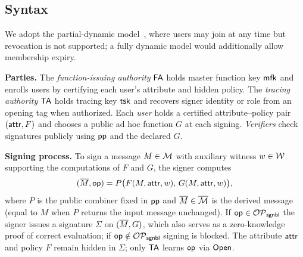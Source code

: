 \subsection{Syntax}\label{subsection:sms-syntax}

We adopt the partial-dynamic model~\cite{KiayiasY06},
where users may join at any time but revocation is not supported;
a fully dynamic model would additionally allow membership expiry.

\medskip
\noindent\textbf{Parties.}
The \emph{function-issuing authority} $\mathsf{FA}$ holds master function key $\mathsf{mfk}$
and enrolls users by certifying each user's attribute and hidden policy.
The \emph{tracing authority} $\mathsf{TA}$ holds tracing key $\mathsf{tsk}$
and recovers signer identity or role from an opening tag when authorized.
Each \emph{user} holds a certified attribute--policy pair $(\mathsf{attr}, F)$
and chooses a public ad hoc function $G$ at each signing.
\emph{Verifiers} check signatures publicly using $\mathsf{pp}$ and the declared $G$.

\medskip
\noindent\textbf{Signing process.}
To sign a message $M \in \mathcal{M}$ with auxiliary witness
$w \in \mathcal{W}$ supporting the computations of $F$ and $G$,
the signer computes
\[
(\overline{M}, \mathsf{op}) = P\bigl(F(M, \mathsf{attr}, w),\, G(M, \mathsf{attr}, w)\bigr),
\]
where $P$ is the public combiner fixed in $\mathsf{pp}$
and $\overline{M} \in \overline{\mathcal{M}}$ is the derived message
(equal to $M$ when $P$ returns the input message unchanged).
If $\mathsf{op} \in \mathcal{OP}_\mathsf{sgnbl}$ the signer issues a signature $\Sigma$ on $(\overline{M}, G)$,
which also serves as a zero-knowledge proof of correct evaluation;
if $\mathsf{op} \notin \mathcal{OP}_\mathsf{sgnbl}$ signing is blocked.
The attribute $\mathsf{attr}$ and policy $F$ remain hidden in $\Sigma$;
only $\mathsf{TA}$ learns $\mathsf{op}$ via $\mathsf{Open}$.

